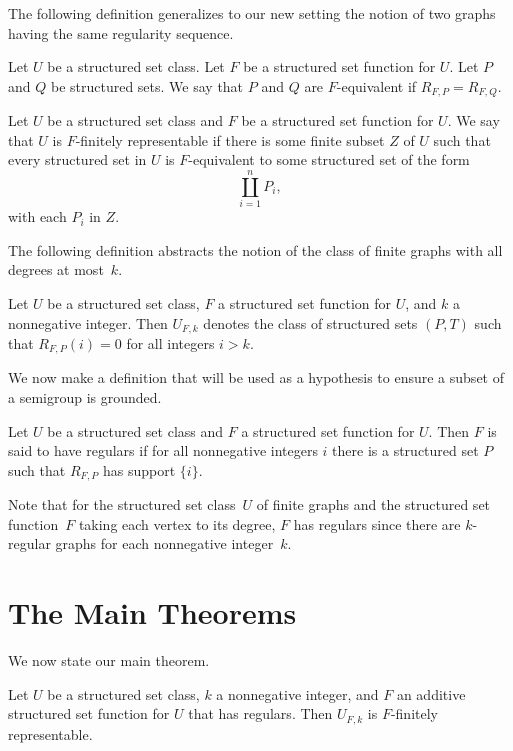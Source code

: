 \documentclass[review]{elsarticle}
\begin{document}
The following definition generalizes to our
new setting the notion of two graphs having the same 
regularity sequence.

\begin{dfn}
Let $U$ be a structured set class.
Let $F$ be a structured set function for $U$. Let $P$ and $Q$ be
structured sets. We say that
$P$ and $Q$ are $F$-equivalent if $R_{F,P}=R_{F,Q}$.
\end{dfn}

\begin{dfn}
Let $U$ be a structured set class and $F$ be a
structured set function for $U$. We say that $U$
is $F$-finitely representable if there is some finite subset $Z$ of $U$
such that every structured set in $U$ is $F$-equivalent to some
structured set of the form
$$\coprod_{i=1}^n P_i,$$
with each $P_i$ in $Z$.
\end{dfn}

The following definition abstracts the notion of the class of finite
graphs with all degrees at most~$k$.

\begin{dfn}
Let $U$ be a structured set class, $F$ a structured set function for $U$,
and $k$ a nonnegative integer. Then $U_{F,k}$ denotes the class of
structured sets
$(P,T)$ such that $R_{F,P}(i)=0$ for all integers $i>k$.
\end{dfn}

We now make a definition that
will be used as a hypothesis to ensure a subset of a semigroup is
grounded.

\begin{dfn}
Let $U$ be a structured set class and $F$ a structured set function for $U$.
Then $F$ is said to have regulars if for all nonnegative integers $i$ there
is a structured set $P$ such that $R_{F,P}$ has support $\{i\}$.
\end{dfn}

Note that for the structured set class~$U$ of finite graphs and the structured
set function~$F$ taking each vertex to its degree, $F$ has regulars since
there are $k$-regular graphs for each nonnegative integer~$k$.

\section{The Main Theorems}

We now state our main theorem.

\begin{thm}\label{main} %
Let $U$ be a structured set class,
$k$ a nonnegative integer, and $F$ an additive
structured set function for $U$ that has regulars.
Then $U_{F,k}$ is $F$-finitely representable.
\end{thm}
\end{document}
